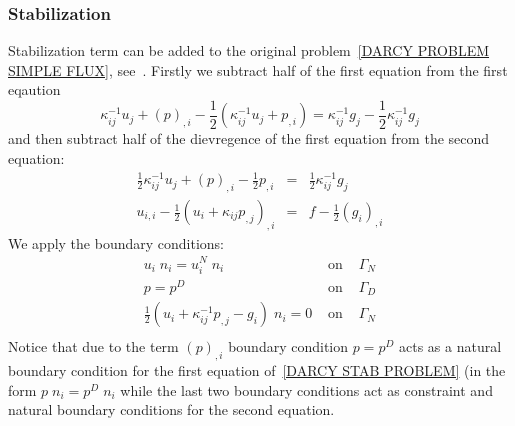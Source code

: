 \subsubsection{Stabilization \label{SEC DARCY STAB}}
Stabilization term can be added to the original problem~\ref{DARCY PROBLEM SIMPLE FLUX}, see~\cite{MasudHughes2002a}.
Firstly we subtract half of the first equation from the first eqaution
\begin{equation}\label{DARCY STAB PROBLEM A}
\kappa^{-1}_{ij} u_{j} + (p)_{,i} - \frac{1}{2} \left(  \kappa^{-1}_{ij} u_{j} + p_{,i} \right) = \kappa^{-1}_{ij} g_j -\frac{1}{2} \kappa^{-1}_{ij} g_j 
\end{equation} 
and then subtract half of the dievregence of the first equation from the second equation:
\begin{equation}\label{DARCY STAB PROBLEM}
\begin{array}{rcl}
\frac{1}{2} \kappa^{-1}_{ij} u_{j} + (p)_{,i} -  \frac{1}{2}  p_{,i}  & = &  \frac{1}{2} \kappa^{-1}_{ij} g_j \\
u_{i,i} - \frac{1}{2}  \left(u_{i} +   \kappa_{ij} p_{,j} \right)_{,i} & = & f - \frac{1}{2} \left(g_{i} \right)_{,i}   
\end{array}
\end{equation} 
We apply the boundary conditions:
\begin{equation}\label{DARCY SYM STAB PROBLEM BOUNDARY}
\begin{array}{rcl}
u_{i} \; n_{i}  = u^{N}_{i}  \; n_{i} & \mbox{ on } & \Gamma_{N} \\
p = p^{D} &  \mbox{ on } & \Gamma_{D} \\ 
\frac{1}{2} \left( u_{i} +   \kappa^{-1}_{ij} p_{,j} - g_{i} \right ) \; n_{i} = 0 &  \mbox{ on } & \Gamma_{N} \\
\end{array}
\end{equation} 
Notice that due to the term $(p)_{,i}$ boundary condition $p = p^{D}$ acts as a natural boundary condition for the
first equation of~\ref{DARCY STAB PROBLEM} (in the form $p  \;  n_i = p^{D}  \;  n_i$ while the last two boundary conditions act as constraint and natural boundary conditions for the second equation.

